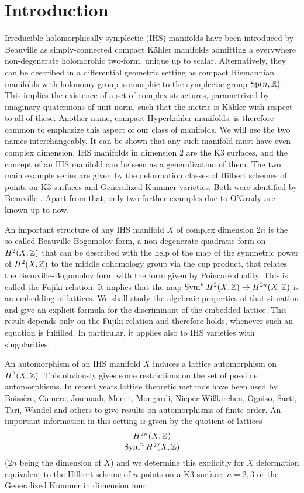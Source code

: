 \section{Introduction}

Irreducible holomorphically symplectic (IHS) manifolds have been introduced by Beauville \cite{Beauville} as simply-connected compact K\"ahler manifolds admitting a everywhere non-degenerate holomorohic two-form, unique up to scalar. 
Alternatively, they can be described in a differential geometric setting as compact Riemannian manifolds with holonomy group isomorphic to the symplectic group $\operatorname{Sp}(n,\mathbb{R})$. This implies the existence of a set of complex structures, parametrized by imaginary quaternions of unit norm, such that the metric is K\"ahler with respect to all of these. 
Another name, compact Hyperk\"ahler manifolds, is therefore common to emphasize this aspect of our class of manifolds. We will use the two names interchangeably.
It can be shown that any such manifold must have even complex dimension. IHS manifolds in dimension 2 are the K3 surfaces, and the concept of an IHS manifold can be seen as a generalization of them. The two main example series are given by the deformation classes of Hilbert schemes of points on K3 surfaces and Generalized Kummer varieties. Both were identified by Beauville \cite{Beauville}. Apart from that, only two further examples due to O'Grady are known up to now.

An important structure of any IHS manifold $X$ of complex dimension $2n$ is the so-called Beauville-Bogomolov form, a non-degenerate quadratic form on $H^2(X,\mathbb{Z})$ that can be described with the help of the map of the symmetric power of $H^2(X,\mathbb{Z})$ to the middle cohomology group via the cup product, that relates the Beauville-Bogomolov form with the form given by Poincar\'e duality. This is called the Fujiki relation. It implies that the map $\operatorname{Sym}^n H^2(X,\mathbb{Z})\rightarrow H^{2n}(X,\mathbb{Z})$ is an embedding of lattices. We shall study the algebraic properties of that situation and give an explicit formula for the discriminant of the embedded lattice. This result depends only on the Fujiki relation and therefore holds, whenever such an equation is fulfilled. In particular, it applies also to IHS varieties with singularities.

An automorphism of an IHS manifold $X$ induces a lattice automorphism on $H^2(X,\mathbb{Z})$. This obviously gives some restrictions on the set of possible automorphisms.
In recent years lattice theoretic methods have been used by
Boiss\`ere, Camere, Joumaah, Menet, Mongardi, Nieper-Wi\ss kirchen, Oguiso, Sarti, Tari, Wandel and others to give results on
automorphisms of finite order. 
An important information in this setting is given by the quotient of lattices
$$
\frac{H^{2n}(X,\mathbb{Z})}{\operatorname{Sym}^n H^2(X,\mathbb{Z})}
$$
($2n$ being the dimension of $X$) and we determine this explicitly for $X$ deformation equivalent to the Hilbert scheme of $n$ points on a K3 surface, $n=2,3$ or the Generalized Kummer in dimension four. 

